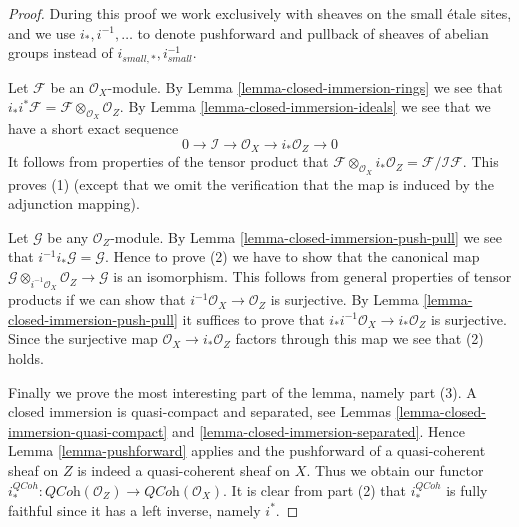 \begin{proof}
During this proof we work exclusively with sheaves on
the small \'etale sites, and we use $i_*, i^{-1}, \ldots$
to denote pushforward and pullback of sheaves of abelian groups
instead of $i_{small, *}, i_{small}^{-1}$.

\medskip\noindent
Let $\mathcal{F}$ be an $\mathcal{O}_X$-module. By
Lemma \ref{lemma-closed-immersion-rings}
we see that
$i_*i^*\mathcal{F} = \mathcal{F} \otimes_{\mathcal{O}_X} \mathcal{O}_Z$.
By
Lemma \ref{lemma-closed-immersion-ideals}
we see that we have a short exact sequence
$$
0 \to \mathcal{I} \to \mathcal{O}_X \to i_*\mathcal{O}_Z \to 0
$$
It follows from properties of the tensor product that
$\mathcal{F} \otimes_{\mathcal{O}_X} i_*\mathcal{O}_Z
= \mathcal{F}/\mathcal{I}\mathcal{F}$. This proves (1) (except
that we omit the verification that the map is induced by the
adjunction mapping).

\medskip\noindent
Let $\mathcal{G}$ be any $\mathcal{O}_Z$-module. By
Lemma \ref{lemma-closed-immersion-push-pull}
we see that $i^{-1}i_*\mathcal{G} = \mathcal{G}$.
Hence to prove (2) we have to show that the canonical map
$\mathcal{G} \otimes_{i^{-1}\mathcal{O}_X} \mathcal{O}_Z \to \mathcal{G}$
is an isomorphism. This follows from general properties of tensor products
if we can show that $i^{-1}\mathcal{O}_X \to \mathcal{O}_Z$ is surjective. By
Lemma \ref{lemma-closed-immersion-push-pull}
it suffices to prove that
$i_*i^{-1}\mathcal{O}_X \to i_*\mathcal{O}_Z$
is surjective. Since the surjective map $\mathcal{O}_X \to i_*\mathcal{O}_Z$
factors through this map we see that (2) holds.

\medskip\noindent
Finally we prove the most interesting part of the lemma, namely part (3).
A closed immersion is quasi-compact and separated, see
Lemmas \ref{lemma-closed-immersion-quasi-compact} and
\ref{lemma-closed-immersion-separated}. Hence
Lemma \ref{lemma-pushforward}
applies and the pushforward of a quasi-coherent
sheaf on $Z$ is indeed a quasi-coherent sheaf on $X$.
Thus we obtain our functor
$i^{QCoh}_* : \textit{QCoh}(\mathcal{O}_Z)
\to \textit{QCoh}(\mathcal{O}_X)$.
It is clear from part (2) that $i^{QCoh}_*$ is fully faithful since
it has a left inverse, namely $i^*$.


\end{proof}
